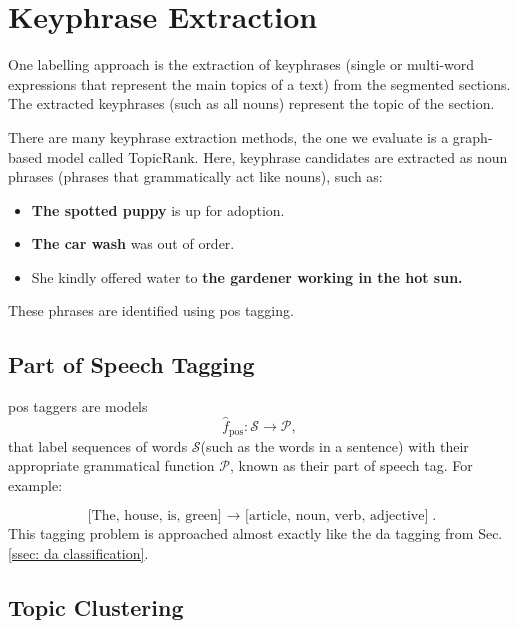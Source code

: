    \section{Keyphrase Extraction \label{ssec: keyphrase extraction}}
    One labelling approach is the extraction of \glspl{keyphrase} (single or multi-word expressions that represent the main topics of a text) from the segmented sections\cite{hasan2014automatic}. The extracted \glspl{keyphrase} (such as all nouns) represent the topic of the section.

    There are many \gls{keyphrase} extraction methods, the one we evaluate is a graph-based \gls{model} called TopicRank\cite{bougouin-etal-2013-topicrank}. Here, \gls{keyphrase} candidates are extracted as noun phrases (phrases that grammatically act like nouns), such as:

    \begin{itemize}
        \item \textbf{The spotted puppy} is up for adoption.
        \item \textbf{The car wash} was out of order.
        \item She kindly offered water to \textbf{the gardener working in the hot sun.}
    \end{itemize}

    These phrases are identified using \gls{pos} tagging.
        \subsection{Part of Speech Tagging \label{sssec: POS tagging}}

        \Gls{pos} taggers are \glspl{model}
        \begin{equation}
          \hat{f}_{\text{pos}}: \mathcal{S} \rightarrow \mathcal{P},
        \end{equation}
        that label sequences of words $\mathcal{S}$(such as the words in a sentence) with their appropriate grammatical function $\mathcal{P}$, known as their part of speech tag. For example:

        \begin{equation*}
        \text{[The, house, is, green] $\rightarrow$ [article, noun, verb, adjective]}.
        \end{equation*}
        This tagging problem is approached almost exactly like the \gls{da} tagging from Sec. \ref{ssec: da classification}.


        \subsection{Topic Clustering}

